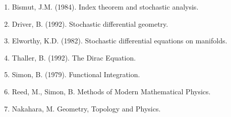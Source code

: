 \documentclass[11pt]{article}
\begin{document}
\begin{enumerate}
\item Bismut, J.M. (1984). Index theorem and stochastic analysis.
\item Driver, B. (1992). Stochastic differential geometry.
\item Elworthy, K.D. (1982). Stochastic differential equations on manifolds.
\item Thaller, B. (1992). The Dirac Equation.
\item Simon, B. (1979). Functional Integration.
\item Reed, M., Simon, B. Methods of Modern Mathematical Physics.
\item Nakahara, M. Geometry, Topology and Physics.
\end{enumerate}
\end{document}
